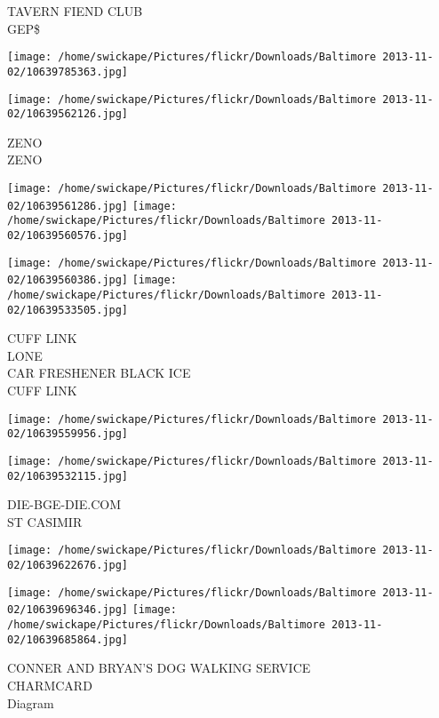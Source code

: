 \documentclass[10pt,letterpaper]{article}
\begin{document}
TAVERN FIEND CLUB\\
GEP\$\\
\pagebreak

\texttt{[image: /home/swickape/Pictures/flickr/Downloads/Baltimore 2013-11-02/10639785363.jpg]}

\vspace{0.25in}
\texttt{[image: /home/swickape/Pictures/flickr/Downloads/Baltimore 2013-11-02/10639562126.jpg]}

ZENO\\
ZENO\\
\pagebreak

\texttt{[image: /home/swickape/Pictures/flickr/Downloads/Baltimore 2013-11-02/10639561286.jpg]}
\texttt{[image: /home/swickape/Pictures/flickr/Downloads/Baltimore 2013-11-02/10639560576.jpg]}

\texttt{[image: /home/swickape/Pictures/flickr/Downloads/Baltimore 2013-11-02/10639560386.jpg]}
\texttt{[image: /home/swickape/Pictures/flickr/Downloads/Baltimore 2013-11-02/10639533505.jpg]}

CUFF LINK\\
LONE\\
CAR FRESHENER BLACK ICE\\
CUFF LINK\\
\pagebreak

\texttt{[image: /home/swickape/Pictures/flickr/Downloads/Baltimore 2013-11-02/10639559956.jpg]}

\vspace{0.25in}
\texttt{[image: /home/swickape/Pictures/flickr/Downloads/Baltimore 2013-11-02/10639532115.jpg]}

DIE{-}BGE{-}DIE.COM\\
ST CASIMIR\\
\pagebreak

\texttt{[image: /home/swickape/Pictures/flickr/Downloads/Baltimore 2013-11-02/10639622676.jpg]}

\vspace{0.25in}
\texttt{[image: /home/swickape/Pictures/flickr/Downloads/Baltimore 2013-11-02/10639696346.jpg]}
\texttt{[image: /home/swickape/Pictures/flickr/Downloads/Baltimore 2013-11-02/10639685864.jpg]}

CONNER AND BRYAN'S DOG WALKING SERVICE\\
CHARMCARD\\
Diagram\\
\pagebreak
\end{document}
